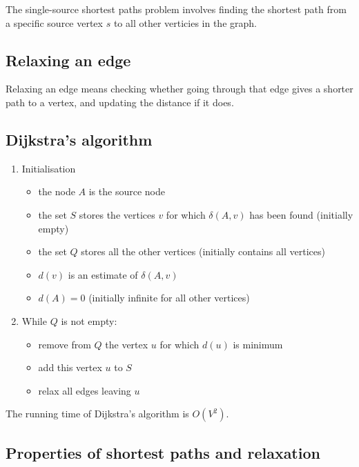 \documentclass[11pt]{article}
\providecommand{\tightlist}{%
      \setlength{\itemsep}{0pt}\setlength{\parskip}{0pt}}
\begin{document}
The single-source shortest paths problem involves finding the shortest
path from a specific source vertex \(s\) to all other verticies in the
graph.

    \subsection{Relaxing an edge}\label{relaxing-an-edge}

Relaxing an edge means checking whether going through that edge gives a
shorter path to a vertex, and updating the distance if it does.

    \subsection{Dijkstra's algorithm}\label{dijkstras-algorithm}

\begin{enumerate}
\def\labelenumi{\arabic{enumi}.}
\tightlist
\item
  Initialisation

  \begin{itemize}
  \tightlist
  \item
    the node \(A\) is the source node
  \item
    the set \(S\) stores the vertices \(v\) for which \(\delta(A, v)\)
    has been found (initially empty)
  \item
    the set \(Q\) stores all the other vertices (initially contains all
    vertices)
  \item
    \(d(v)\) is an estimate of \(\delta(A, v)\)
  \item
    \(d(A) = 0\) (initially infinite for all other vertices)
  \end{itemize}
\item
  While \(Q\) is not empty:

  \begin{itemize}
  \tightlist
  \item
    remove from \(Q\) the vertex \(u\) for which \(d(u)\) is minimum
  \item
    add this vertex \(u\) to \(S\)
  \item
    relax all edges leaving \(u\)
  \end{itemize}
\end{enumerate}

The running time of Dijkstra's algorithm is \(O(V^2)\).

    \subsection{Properties of shortest paths and
relaxation}\label{properties-of-shortest-paths-and-relaxation}
\end{document}
